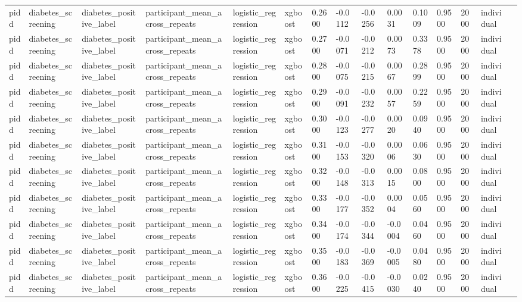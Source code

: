 \begin{tabular}{lllllllllllllll}
pidd & diabetes\_screening & diabetes\_positive\_label & participant\_mean\_across\_repeats & logistic\_regression & xgboost & 0.2600 & -0.0112 & -0.0256 & 0.0031 & 0.1009 & 0.9500 & 2000 & individual &  \\
pidd & diabetes\_screening & diabetes\_positive\_label & participant\_mean\_across\_repeats & logistic\_regression & xgboost & 0.2700 & -0.0071 & -0.0212 & 0.0073 & 0.3378 & 0.9500 & 2000 & individual &  \\
pidd & diabetes\_screening & diabetes\_positive\_label & participant\_mean\_across\_repeats & logistic\_regression & xgboost & 0.2800 & -0.0075 & -0.0215 & 0.0067 & 0.2899 & 0.9500 & 2000 & individual &  \\
pidd & diabetes\_screening & diabetes\_positive\_label & participant\_mean\_across\_repeats & logistic\_regression & xgboost & 0.2900 & -0.0091 & -0.0232 & 0.0057 & 0.2259 & 0.9500 & 2000 & individual &  \\
pidd & diabetes\_screening & diabetes\_positive\_label & participant\_mean\_across\_repeats & logistic\_regression & xgboost & 0.3000 & -0.0123 & -0.0277 & 0.0020 & 0.0940 & 0.9500 & 2000 & individual &  \\
pidd & diabetes\_screening & diabetes\_positive\_label & participant\_mean\_across\_repeats & logistic\_regression & xgboost & 0.3100 & -0.0153 & -0.0320 & 0.0006 & 0.0630 & 0.9500 & 2000 & individual &  \\
pidd & diabetes\_screening & diabetes\_positive\_label & participant\_mean\_across\_repeats & logistic\_regression & xgboost & 0.3200 & -0.0148 & -0.0313 & 0.0015 & 0.0800 & 0.9500 & 2000 & individual &  \\
pidd & diabetes\_screening & diabetes\_positive\_label & participant\_mean\_across\_repeats & logistic\_regression & xgboost & 0.3300 & -0.0177 & -0.0352 & 0.0004 & 0.0560 & 0.9500 & 2000 & individual &  \\
pidd & diabetes\_screening & diabetes\_positive\_label & participant\_mean\_across\_repeats & logistic\_regression & xgboost & 0.3400 & -0.0174 & -0.0344 & -0.0004 & 0.0460 & 0.9500 & 2000 & individual &  \\
pidd & diabetes\_screening & diabetes\_positive\_label & participant\_mean\_across\_repeats & logistic\_regression & xgboost & 0.3500 & -0.0183 & -0.0369 & -0.0005 & 0.0480 & 0.9500 & 2000 & individual &  \\
pidd & diabetes\_screening & diabetes\_positive\_label & participant\_mean\_across\_repeats & logistic\_regression & xgboost & 0.3600 & -0.0225 & -0.0415 & -0.0030 & 0.0240 & 0.9500 & 2000 & individual &  \\

\end{tabular}
